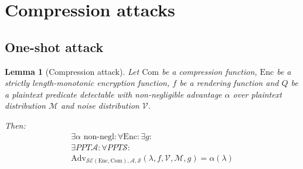 \documentclass[conference, letterpaper, 10pt]{IEEEtran}
\newtheorem{lemma}{Lemma}
\begin{document}
\section{Compression attacks}\label{sec:comattack}

\subsection{One-shot attack}

\begin{lemma}[Compression attack]

Let $\textrm{Com}$ be a compression function, $\textrm{Enc}$ be a strictly length-monotonic
encryption function, $f$ be a rendering function and $Q$ be a plaintext
predicate detectable with non-negligible advantage $\alpha$ over plaintext
distribution $\mathcal{M}$ and noise distribution $\mathcal{V}$.

Then:
\begin{align*}
    \exists \alpha \text{ non-negl}:
    \forall \textrm{Enc}:
    \exists g:\\
    \exists PPT \mathcal{A}:
    \forall PPT \mathcal{S}:\\
    \text{Adv}_{\mathcal{SE}(\textrm{Enc}, \textrm{Com}), \mathcal{A}, \mathcal{S}}
    (\lambda, f, \mathcal{V}, \mathcal{M}, g) = \alpha(\lambda)
\end{align*}

\end{lemma}
\end{document}
